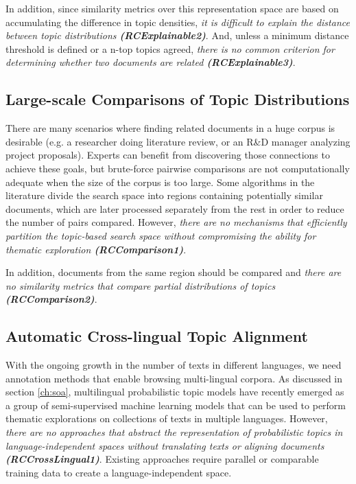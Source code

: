 In addition, since similarity metrics over this representation space are based on accumulating the difference in topic densities, \textit{it is difficult to explain the distance between topic distributions \textbf{(RCExplainable2)}}. And, unless a minimum distance threshold is defined or a n-top topics agreed, \textit{there is no common criterion for determining whether two documents are related \textbf{(RCExplainable3)}}.  


\subsection{Large-scale Comparisons of Topic Distributions}

There are many scenarios where finding related documents in a huge corpus is desirable (e.g. a researcher doing literature review, or an R\&D  manager analyzing project proposals). Experts can benefit from discovering those connections to achieve these goals, but brute-force pairwise comparisons are not computationally adequate when the size of the corpus is too large. Some algorithms in the literature divide the search space into regions containing potentially similar documents, which are later processed separately from the rest in order to reduce the number of pairs compared. However, \textit{there are no mechanisms that efficiently partition the topic-based search space without compromising the ability for thematic exploration \textbf{(RCComparison1)}}.

In addition, documents from the same region should be compared and \textit{there are no similarity metrics that compare partial distributions of topics \textbf{(RCComparison2)}}.


\subsection{Automatic Cross-lingual Topic Alignment}

With the ongoing growth in the number of texts in different languages, we need annotation methods that enable browsing multi-lingual corpora. As discussed in section \ref{ch:soa}, multilingual probabilistic topic models have recently emerged as a group of semi-supervised machine learning models that can be used to perform thematic explorations on collections of texts in multiple languages. However, \textit{there are no approaches that abstract the representation of probabilistic topics in language-independent spaces without translating texts or aligning documents \textbf{(RCCrossLingual1)}}. Existing approaches require parallel or comparable training data to create a language-independent space. 

